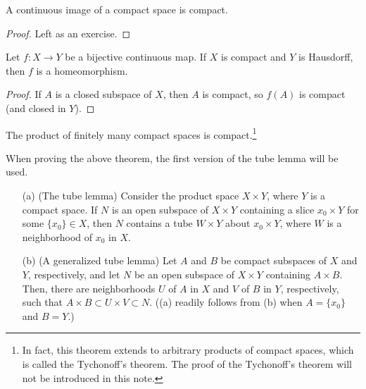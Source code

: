 \begin{prop}
    A continuous image of a compact space is compact.
\end{prop}
\begin{proof}
    \color{brown}Left as an exercise.\color{black}
\end{proof}

\begin{prop}
    Let $f: X\rightarrow Y$ be a bijective continuous map.
    If $X$ is compact and $Y$ is Hausdorff, then $f$ is a homeomorphism.
\end{prop}
\begin{proof}
    If $A$ is a closed subspace of $X$, then $A$ is compact, so $f(A)$ is compact (and closed in $Y$).
\end{proof}

\begin{thm}\label{products of compact spaces}
    The product of finitely many compact spaces is compact.\footnote{In fact, this theorem extends to arbitrary products of compact spaces, which is called the Tychonoff's theorem.
    The proof of the Tychonoff's theorem will not be introduced in this note.}
\end{thm}
When proving the above theorem, the first version of the tube lemma will be used.
\begin{lem}\label{tube lemmas}
    \begin{enumerate}
        \item[(a)]
        {
            (The tube lemma)
            Consider the product space $X\times Y$, where $Y$ is a compact space.
            If $N$ is an open subspace of $X\times Y$ containing a slice $x_0\times Y$ for some $\{x_0\}\in X$, then $N$ contains a tube $W\times Y$ about $x_0\times Y$, where $W$ is a neighborhood of $x_0$ in $X$.
        }
        \item[(b)]
        {
            (A generalized tube lemma)
            Let $A$ and $B$ be compact subspaces of $X$ and $Y$, respectively, and let $N$ be an open subspace of $X\times Y$ containing $A\times B$.
            Then, there are neighborhoods $U$ of $A$ in $X$ and $V$ of $B$ in $Y$, respectively, such that $A\times B\subset U\times V\subset N$.
            ((a) readily follows from (b) when $A=\{x_0\}$ and $B=Y$.)
        }
    \end{enumerate}
\end{lem}
